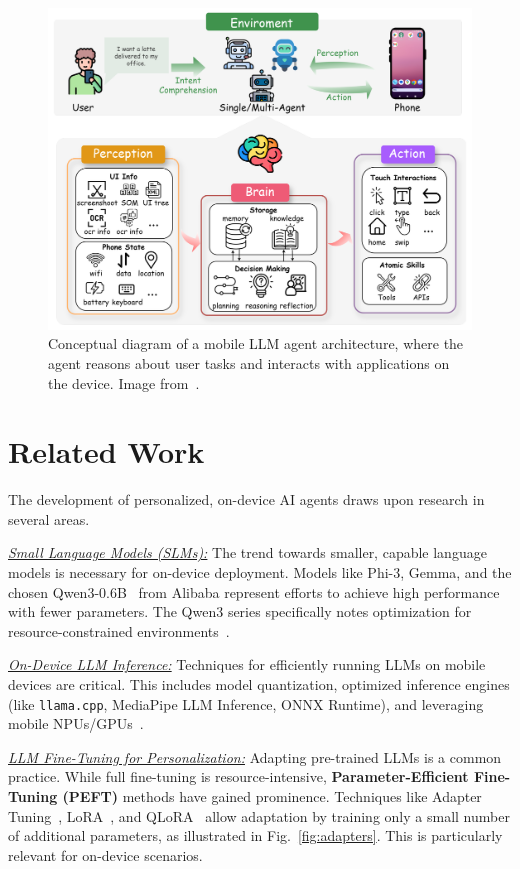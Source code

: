 \documentclass[conference]{IEEEtran}
\begin{document}
\begin{figure}[t]
\centering
\includegraphics[width=0.9\linewidth]{images/mobile_agent_image.png}
\caption{Conceptual diagram of a mobile LLM agent architecture, where the agent reasons about user tasks and interacts with applications on the device. Image from~\cite{mobileagentimage}.}
\label{fig:mobile_agent}
\end{figure}

\section{Related Work}
The development of personalized, on-device AI agents draws upon research in several areas.

\textit{\uline{Small Language Models (SLMs):}} The trend towards smaller, capable language models is necessary for on-device deployment. Models like Phi-3, Gemma, and the chosen Qwen3-0.6B~\cite{qwen} from Alibaba represent efforts to achieve high performance with fewer parameters. The Qwen3 series specifically notes optimization for resource-constrained environments~\cite{qwen3blog}.

\textit{\uline{On-Device LLM Inference:}} Techniques for efficiently running LLMs on mobile devices are critical. This includes model quantization, optimized inference engines (like \texttt{llama.cpp}, MediaPipe LLM Inference, ONNX Runtime), and leveraging mobile NPUs/GPUs~\cite{efficiency}.

\textit{\uline{LLM Fine-Tuning for Personalization:}} Adapting pre-trained LLMs is a common practice. While full fine-tuning is resource-intensive, \textbf{Parameter-Efficient Fine-Tuning (PEFT)} methods have gained prominence. Techniques like Adapter Tuning~\cite{adapterspaper}, LoRA~\cite{lora}, and QLoRA~\cite{qlora} allow adaptation by training only a small number of additional parameters, as illustrated in Fig.~\ref{fig:adapters}. This is particularly relevant for on-device scenarios.
\end{document}
